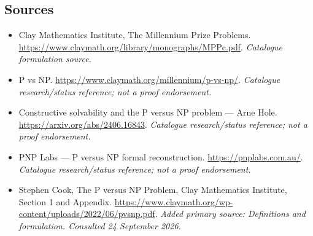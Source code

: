 \documentclass[11pt]{article}
\begin{document}
\subsection{Sources}
\begin{itemize}\raggedright
\item[\textnormal{[S1]}]\hypertarget{source:statement:1}{} Clay Mathematics Institute, The Millennium Prize Problems.
\url{https://www.claymath.org/library/monographs/MPPc.pdf}.
{\small\textit{Catalogue formulation source.}}
\item[\textnormal{[S2]}]\hypertarget{source:statement:2}{} P vs NP.
\url{https://www.claymath.org/millennium/p-vs-np/}.
{\small\textit{Catalogue research/status reference; not a proof endorsement.}}
\item[\textnormal{[S3]}]\hypertarget{source:statement:3}{} Constructive solvability and the P versus NP problem — Arne Hole.
\url{https://arxiv.org/abs/2406.16843}.
{\small\textit{Catalogue research/status reference; not a proof endorsement.}}
\item[\textnormal{[S4]}]\hypertarget{source:statement:4}{} PNP Labs — P versus NP formal reconstruction.
\url{https://pnplabs.com.au/}.
{\small\textit{Catalogue research/status reference; not a proof endorsement.}}
\item[\textnormal{[E1]}]\hypertarget{extra:statement:1}{} Stephen Cook, The P versus NP Problem, Clay Mathematics Institute, Section 1 and Appendix.
\url{https://www.claymath.org/wp-content/uploads/2022/06/pvsnp.pdf}.
{\small\textit{Added primary source: Definitions and formulation. Consulted 24 September 2026.}}


\end{itemize}
\end{document}
